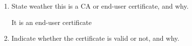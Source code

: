 \documentclass[12pt]{article}
\begin{document}
\begin{enumerate}
\begin{enumerate}
\begin{verbatim}
\end{verbatim}

\item{State weather this is a CA or end-user certificate, and why.}

It is an end-user certificate 

\item{Indicate whether the certificate is valid or not, and why.}

\end{enumerate}
	
	
		\vspace{10pt}
	
	
	    
\end{enumerate}
\end{document}
